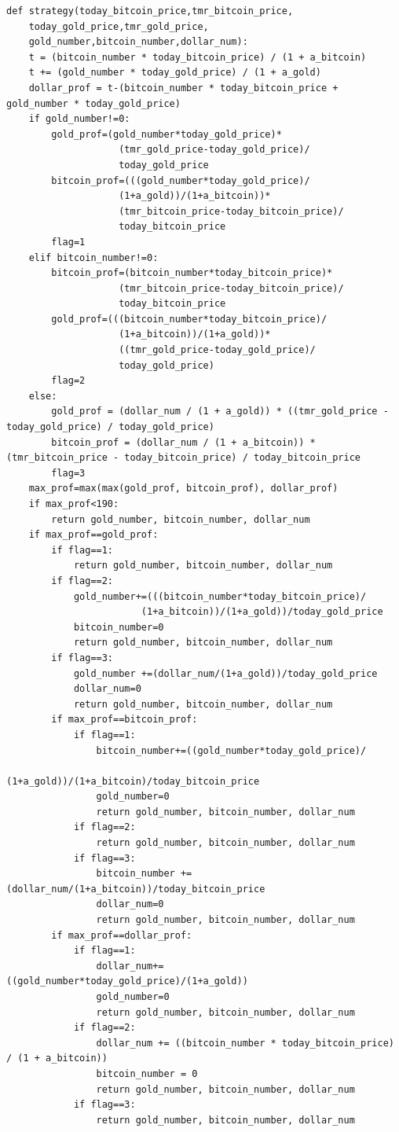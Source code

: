 \documentclass[12pt]{article}
\begin{document}
\begin{lstlisting}
def strategy(today_bitcoin_price,tmr_bitcoin_price,
    today_gold_price,tmr_gold_price,
    gold_number,bitcoin_number,dollar_num):
    t = (bitcoin_number * today_bitcoin_price) / (1 + a_bitcoin)
    t += (gold_number * today_gold_price) / (1 + a_gold)
    dollar_prof = t-(bitcoin_number * today_bitcoin_price + gold_number * today_gold_price)
    if gold_number!=0:
        gold_prof=(gold_number*today_gold_price)*
                    (tmr_gold_price-today_gold_price)/
                    today_gold_price
        bitcoin_prof=(((gold_number*today_gold_price)/
                    (1+a_gold))/(1+a_bitcoin))*
                    (tmr_bitcoin_price-today_bitcoin_price)/
                    today_bitcoin_price
        flag=1
    elif bitcoin_number!=0:
        bitcoin_prof=(bitcoin_number*today_bitcoin_price)*
                    (tmr_bitcoin_price-today_bitcoin_price)/
                    today_bitcoin_price
        gold_prof=(((bitcoin_number*today_bitcoin_price)/
                    (1+a_bitcoin))/(1+a_gold))*
                    ((tmr_gold_price-today_gold_price)/
                    today_gold_price)
        flag=2
    else:
        gold_prof = (dollar_num / (1 + a_gold)) * ((tmr_gold_price - today_gold_price) / today_gold_price)
        bitcoin_prof = (dollar_num / (1 + a_bitcoin)) * (tmr_bitcoin_price - today_bitcoin_price) / today_bitcoin_price
        flag=3
    max_prof=max(max(gold_prof, bitcoin_prof), dollar_prof)
    if max_prof<190:
        return gold_number, bitcoin_number, dollar_num
    if max_prof==gold_prof:
        if flag==1:
            return gold_number, bitcoin_number, dollar_num
        if flag==2:
            gold_number+=(((bitcoin_number*today_bitcoin_price)/
                        (1+a_bitcoin))/(1+a_gold))/today_gold_price
            bitcoin_number=0
            return gold_number, bitcoin_number, dollar_num
        if flag==3:
            gold_number +=(dollar_num/(1+a_gold))/today_gold_price
            dollar_num=0
            return gold_number, bitcoin_number, dollar_num
        if max_prof==bitcoin_prof:
            if flag==1:
                bitcoin_number+=((gold_number*today_gold_price)/
                                (1+a_gold))/(1+a_bitcoin)/today_bitcoin_price
                gold_number=0
                return gold_number, bitcoin_number, dollar_num
            if flag==2:
                return gold_number, bitcoin_number, dollar_num
            if flag==3:
                bitcoin_number +=(dollar_num/(1+a_bitcoin))/today_bitcoin_price
                dollar_num=0
                return gold_number, bitcoin_number, dollar_num
        if max_prof==dollar_prof:
            if flag==1:
                dollar_num+=((gold_number*today_gold_price)/(1+a_gold))
                gold_number=0
                return gold_number, bitcoin_number, dollar_num
            if flag==2:
                dollar_num += ((bitcoin_number * today_bitcoin_price) / (1 + a_bitcoin))
                bitcoin_number = 0
                return gold_number, bitcoin_number, dollar_num
            if flag==3:
                return gold_number, bitcoin_number, dollar_num
\end{lstlisting}
\end{document}
